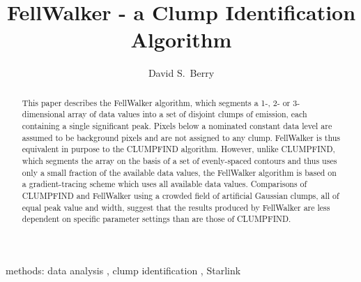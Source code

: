 \documentclass[final,authoryear,5p,times,twocolumn]{elsarticle}
\begin{document}
\begin{frontmatter}



\title{FellWalker - a Clump Identification Algorithm }


\author[jac]{David S.\ Berry}


\address[jac]{Joint Astronomy Centre, 660 N.\ A`oh\=ok\=u Place, Hilo, HI
  96720, USA}

\begin{abstract}
This paper describes the FellWalker algorithm, which segments a 1-, 2- or
3-dimensional array of data values into a set of disjoint clumps of
emission, each containing a single significant peak. Pixels below a
nominated constant data level are assumed to be background pixels and are
not assigned to any clump. FellWalker is thus equivalent in purpose to
the CLUMPFIND algorithm. However, unlike CLUMPFIND, which segments the
array on the basis of a set of evenly-spaced contours and thus uses only
a small fraction of the available data  values, the FellWalker algorithm
is based on a gradient-tracing scheme which uses all available data values.
Comparisons of CLUMPFIND and FellWalker using a crowded field of
artificial Gaussian clumps, all of equal peak value and width, suggest
that the results produced by FellWalker are less dependent on specific
parameter settings than are those of CLUMPFIND.
\end{abstract}

\begin{keyword}

methods: data analysis \sep
clump identification \sep
Starlink

\end{keyword}

\end{frontmatter}
\end{document}
